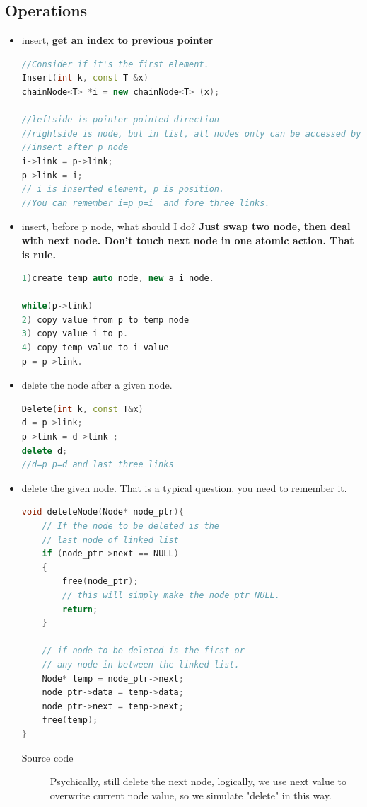 \documentclass[a4paper,11pt,twoside]{book}
\begin{document}
\subsection{Operations}
\begin{itemize}
\item insert, \textbf{get an index to previous pointer}
\begin{lstlisting}[frame=single, language=c++, mathescape=true]
//Consider if it's the first element. 
Insert(int k, const T &x)
chainNode<T> *i = new chainNode<T> (x);

//leftside is pointer pointed direction
//rightside is node, but in list, all nodes only can be accessed by a pointer.
//insert after p node 
i->link = p->link;
p->link = i;
// i is inserted element, p is position.  
//You can remember i=p p=i  and fore three links.
\end{lstlisting}

\item insert, before p node, what should I do?  \textbf{Just swap two node, then deal with next node. Don't touch next node in one atomic action. That is rule. }
\begin{lstlisting}[frame=single, language=c++, mathescape=true]
1)create temp auto node, new a i node.
 
while(p->link) 
2) copy value from p to temp node
3) copy value i to p.
4) copy temp value to i value
p = p->link.  
\end{lstlisting}

\item delete the node after a given node.
\begin{lstlisting}[frame=single, language=c++]
Delete(int k, const T&x)
d = p->link;
p->link = d->link ;
delete d;
//d=p p=d and last three links
\end{lstlisting}

\item delete the given node. That is a typical question. you need to remember it. 
\begin{lstlisting}[frame=single, language=c++]
void deleteNode(Node* node_ptr){
	// If the node to be deleted is the 
	// last node of linked list
	if (node_ptr->next == NULL)
	{
		free(node_ptr);
		// this will simply make the node_ptr NULL.
		return;
	}
	
	// if node to be deleted is the first or 
	// any node in between the linked list.
	Node* temp = node_ptr->next;
	node_ptr->data = temp->data;
	node_ptr->next = temp->next;
	free(temp);
}
\end{lstlisting}
\begin{description}
	\item[Source code] Psychically, still delete the next node, logically, we use next value to overwrite current node value, so we simulate "delete" in this way. 
\end{description}


\end{itemize}
\end{document}
